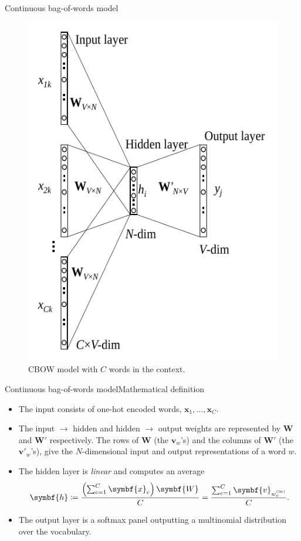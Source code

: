 \documentclass[serif, xcolor={svgnames, table}, usepdftitle=false]{beamer}
\renewcommand*{\vec}{\symbf}
\newcommand*{\mat}{\symbf}
\begin{document}
\begin{frame}{Continuous bag-of-words model}
  \begin{figure}
    \centering
    \includegraphics[width=.4\textwidth]{CBOW.pdf}
    \caption{CBOW model with \(C\) words in the context.}
  \end{figure}
\end{frame}

\begin{frame}{Continuous bag-of-words model}{Mathematical definition}
  \begin{itemize}
  \item The input consists of one-hot encoded words,
    \(\vec{x}_1, \ldots, \vec{x}_C\).
  \item The input \(\to\) hidden and hidden \(\to\) output weights are
    represented by \(\mat{W}\) and \(\mat{W}'\) respectively.  The rows of
    \(\mat{W}\) (the \(\vec{v}_w\)'s) and the columns of \(\mat{W}'\) (the
    \(\vec{v}'_w\)'s), give the \alert{\(N\)-dimensional input} and
    \alert{output representations} of a word \(w\).
  \item The hidden layer is \emph{linear} and computes an average
    \[
      \vec{h} \coloneqq \frac{\left(\sum\nolimits_{c = 1}^{C} \vec{x}_c\right)
        \mat{W}}{C} = \frac{\sum\nolimits_{c = 1}^{C}
        \vec{v}_{\wi_c}}{C}\text{.}
    \]
  \item The output layer is a softmax panel outputting a multinomial
    distribution over the vocabulary.
  \end{itemize}
\end{frame}
\end{document}

